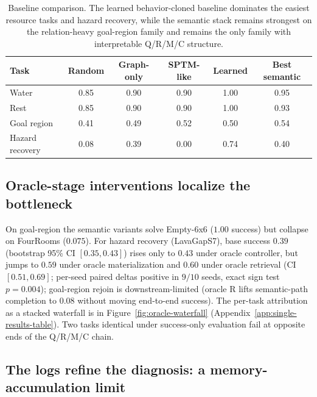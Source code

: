 \documentclass{article}
\begin{document}
\begin{table}[t]
  \caption{Baseline comparison. The learned behavior-cloned baseline dominates the easiest resource tasks and hazard recovery, while the semantic stack remains strongest on the relation-heavy goal-region family and remains the only family with interpretable Q/R/M/C structure.}
  \label{tab:baselines}
  \centering
  \small
  \begin{tabular}{p{1.9cm}c c c c c}
    \toprule
    Task & Random & Graph-only & SPTM-like & Learned & Best semantic \\
    \midrule
    Water & 0.85 & 0.90 & 0.90 & 1.00 & 0.95 \\
    Rest & 0.85 & 0.90 & 0.90 & 1.00 & 0.93 \\
    Goal region & 0.41 & 0.49 & 0.52 & 0.50 & 0.54 \\
    Hazard recovery & 0.08 & 0.39 & 0.00 & 0.74 & 0.40 \\
    \bottomrule
  \end{tabular}
\end{table}

\subsection{Oracle-stage interventions localize the bottleneck}
\label{sec:oracle}

On goal-region the semantic variants solve Empty-6x6 ($1.00$ success) but collapse on FourRooms ($0.075$). For hazard recovery (LavaGapS7), base success $0.39$ (bootstrap 95\% CI $[0.35,0.43]$) rises only to $0.43$ under oracle controller, but jumps to $0.59$ under oracle materialization and $0.60$ under oracle retrieval (CI $[0.51,0.69]$; per-seed paired deltas positive in $9/10$ seeds, exact sign test $p{=}0.004$); goal-region rejoin is downstream-limited (oracle R lifts semantic-path completion to $0.08$ without moving end-to-end success). The per-task attribution as a stacked waterfall is in Figure~\ref{fig:oracle-waterfall} (Appendix~\ref{app:single-results-table}). Two tasks identical under success-only evaluation fail at opposite ends of the Q/R/M/C chain.

\subsection{The logs refine the diagnosis: a memory-accumulation limit}
\label{sec:refined-attribution}
\end{document}
